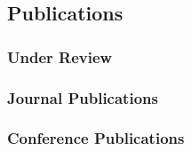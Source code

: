 \documentclass[letterpaper, 11pt]{article}
\begin{document}
\subsection*{Publications}
\subsubsection*{Under Review}
\renewcommand*{\labelenumi}{[U\theenumi]}
\subsubsection*{Journal Publications}
\renewcommand*{\labelenumi}{[J\theenumi]}
\subsubsection*{Conference Publications}
\renewcommand*{\labelenumi}{[C\theenumi]}

\end{document}
